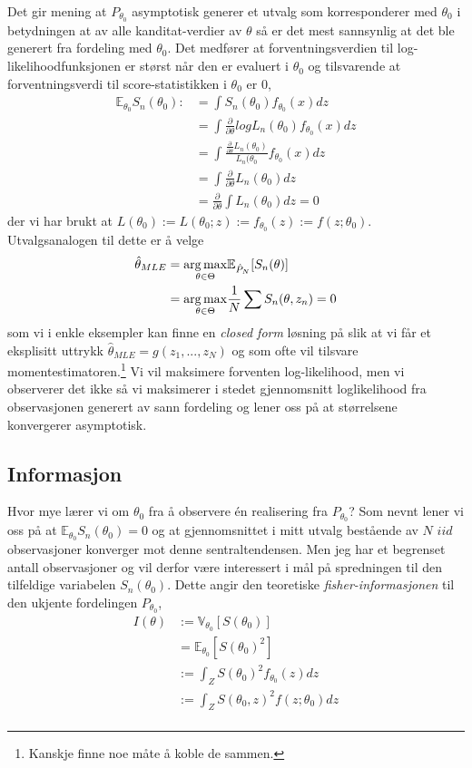 Det gir mening at $P_{\theta_0}$ asymptotisk generer et utvalg som korresponderer med $\theta_0$ i betydningen at av alle kanditat-verdier av $\theta$ så er det mest sannsynlig at det ble generert fra fordeling med $\theta_0$. Det medfører at forventningsverdien til log-likelihoodfunksjonen er størst når den er evaluert i $\theta_0$ og tilsvarende at forventningsverdi til score-statistikken i $\theta_0$ er 0,
\begin{align}
\mathbb{E}_{\theta_0}S_n(\theta_0) :&= \int S_n(\theta_0)f_{\theta_0}(x)dz \\
&= \int \frac{\partial}{\partial \theta}logL_n(\theta_0)f_{\theta_0}(x)dz \\
&= \int \frac{\frac{\partial}{\partial \theta}L_n(\theta_0)}{L_n(\theta_0} f_{\theta_0}(x)dz \\
&= \int \frac{\partial}{\partial \theta}L_n(\theta_0) dz \\
&= \frac{\partial}{\partial \theta} \int L_n(\theta_0) dz = 0
\end{align}
der vi har brukt at $L(\theta_0):=L(\theta_0;z):=f_{\theta_0}(z) := f(z;\theta_0)$. Utvalgsanalogen til dette er å velge
\begin{align}
\hat{\theta}_{MLE} &= \underset{\theta \in \Theta}{\operatorname*{arg\,max}} \mathbb{E}_{\hat{P}_N}[S_n(\theta)] \\
&= \underset{\theta \in \Theta}{\operatorname*{arg\,max}} \frac{1}{N}\sum S_n(\theta,z_n) = 0
\end{align}
som vi i enkle eksempler kan finne en \textit{closed form} løsning på slik at vi får et eksplisitt uttrykk $\hat{\theta}_{MLE} = g(z_1,...,z_N)$ og som ofte vil tilsvare momentestimatoren.\footnote{Kanskje finne noe måte å koble de sammen.} Vi vil maksimere forventen log-likelihood, men vi observerer det ikke så vi maksimerer i stedet gjennomsnitt loglikelihood fra observasjonen generert av sann fordeling og lener oss på at størrelsene konvergerer asymptotisk.
\subsection{Informasjon}
Hvor mye lærer vi om $\theta_0$ fra å observere én realisering fra $P_{\theta_0}$? Som nevnt lener vi oss på at $\mathbb{E}_{\theta_0}S_n(\theta_0) = 0$ og at gjennomsnittet i mitt utvalg bestående av $N$ $iid$ observasjoner konverger mot denne sentraltendensen. Men jeg har et begrenset antall observasjoner og vil derfor være interessert i mål på spredningen til den tilfeldige variabelen $S_n(\theta_0)$. Dette angir den teoretiske \textit{fisher-informasjonen} til den ukjente fordelingen $P_{\theta_0}$,
\begin{align}
I(\theta) &:= \mathbb{V}_{\theta_0}[S(\theta_0)] \\
&= \mathbb{E}_{\theta_0}[S(\theta_0)^2] \\
& := \int_Z S(\theta_0)^2f_{\theta_0}(z)dz \\
& := \int_Z S(\theta_0,z)^2f(z;\theta_0)dz \\
\end{align}

